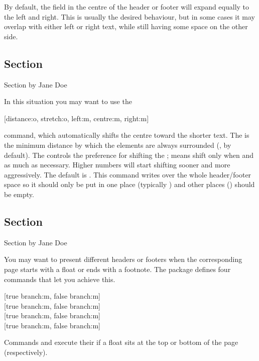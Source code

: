 By default, the field in the centre of the header or footer will expand equally
to the left and right. This is usually the desired behaviour, but in some
cases it may overlap with either left or right text, while still having some
space on the other side.
\begin{example}[standalone, paperheight=3cm]
\geometry{includehead, includefoot, headsep=.5em, footskip=1em} %
\sloppy %
\usepackage{fancyhdr}%
\usepackage{extramarks}%
\pagestyle{fancy}%
\fancyhead[L]{\thepage}
\fancyhead[C]{\firstleftmark}

\section{Section}
Section by Jane Doe
\end{example}
In this situation you may want to use the
\begin{lscommand}
  [distance:o, stretch:o, left:m, centre:m, right:m]
\end{lscommand}
command, which automatically shifts the centre toward the shorter text. The
 is the minimum distance by which the elements are always
surrounded (\cargv{1em}, by default). The  controls the preference
for shifting the ;  means shift only when and as much
as necessary. Higher numbers will start shifting sooner and more aggressively.
The default is . This command writes over the whole header\slash{}footer
space so it should only be put in one place (typically ) and other
places () should be empty.
\begin{example}[standalone, paperheight=3cm]
\geometry{includehead, includefoot, headsep=.5em, footskip=1em} %
\sloppy %
\usepackage{fancyhdr}%
\usepackage{extramarks}%
\pagestyle{fancy}%
\fancyhead[L,R]{}

\section{Section}
Section by Jane Doe
\end{example}

You may want to present different headers or footers when the corresponding
page starts with a float or ends with a footnote. The  package
defines four commands that let you achieve this.
\begin{lscommand}
  [true branch:m, false branch:m] \\
  [true branch:m, false branch:m] \\
  [true branch:m, false branch:m] \\
  [true branch:m, false branch:m]
\end{lscommand}
Commands  and  execute their 
if a float sits at the top or bottom of the page (respectively).

